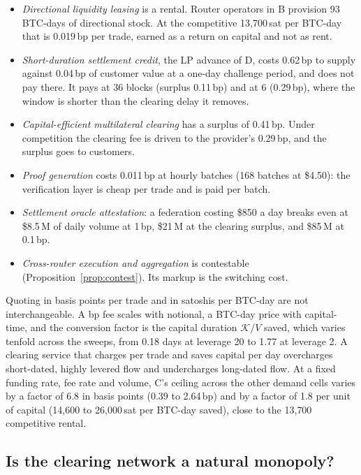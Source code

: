 \begin{itemize}[leftmargin=*,itemsep=1pt]
\item \emph{Directional liquidity leasing} is a rental. Router operators in B provision 93 BTC-days of directional stock. At the competitive 13{,}700\,sat per BTC-day that is 0.019\,bp per trade, earned as a return on capital and not as rent.
\item \emph{Short-duration settlement credit}, the LP advance of D, costs 0.62\,bp to supply against 0.04\,bp of customer value at a one-day challenge period, and does not pay there. It pays at 36 blocks (surplus 0.11\,bp) and at 6 (0.29\,bp), where the window is shorter than the clearing delay it removes.
\item \emph{Capital-efficient multilateral clearing} has a surplus of 0.41\,bp. Under competition the clearing fee is driven to the provider's 0.29\,bp, and the surplus goes to customers.
\item \emph{Proof generation} costs 0.011\,bp at hourly batches (168 batches at \$4.50): the verification layer is cheap per trade and is paid per batch.
\item \emph{Settlement oracle attestation}: a federation costing \$850 a day breaks even at \$8.5\,M of daily volume at 1\,bp, \$21\,M at the clearing surplus, and \$85\,M at 0.1\,bp.
\item \emph{Cross-router execution and aggregation} is contestable (Proposition~\ref{prop:contest}). Its markup is the switching cost.
\end{itemize}

Quoting in basis points per trade and in satoshis per BTC-day are not interchangeable. A bp fee scales with notional, a BTC-day price with capital-time, and the conversion factor is the capital duration $\mathcal K/V$ saved, which varies tenfold across the sweeps, from 0.18 days at leverage 20 to 1.77 at leverage 2. A clearing service that charges per trade and saves capital per day overcharges short-dated, highly levered flow and undercharges long-dated flow. At a fixed funding rate, fee rate and volume, C's ceiling across the other demand cells varies by a factor of 6.8 in basis points (0.39 to 2.64\,bp) and by a factor of 1.8 per unit of capital (14{,}600 to 26{,}000\,sat per BTC-day saved), close to the 13{,}700 competitive rental.

\subsection{Is the clearing network a natural monopoly?}
\label{sec:rent-monopoly}

